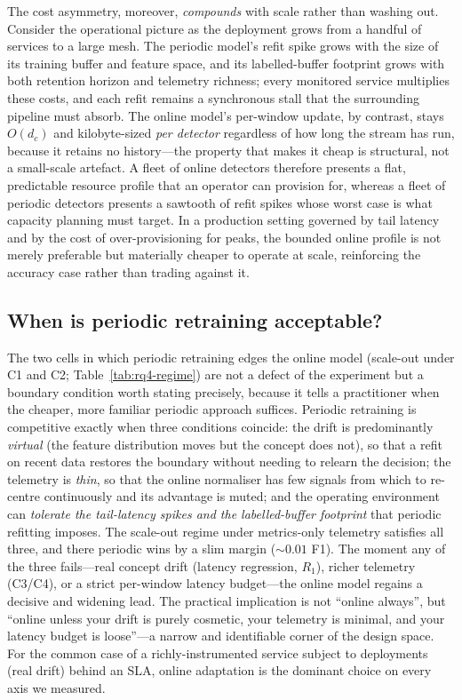 \documentclass[acmsmall]{acmart}
\begin{document}
The cost asymmetry, moreover, \emph{compounds} with scale rather than washing out. Consider the operational picture as the deployment grows from a handful of services to a large mesh. The periodic model's refit spike grows with the size of its training buffer and feature space, and its labelled-buffer footprint grows with both retention horizon and telemetry richness; every monitored service multiplies these costs, and each refit remains a synchronous stall that the surrounding pipeline must absorb. The online model's per-window update, by contrast, stays $O(d_c)$ and kilobyte-sized \emph{per detector} regardless of how long the stream has run, because it retains no history---the property that makes it cheap is structural, not a small-scale artefact. A fleet of online detectors therefore presents a flat, predictable resource profile that an operator can provision for, whereas a fleet of periodic detectors presents a sawtooth of refit spikes whose worst case is what capacity planning must target. In a production setting governed by tail latency and by the cost of over-provisioning for peaks, the bounded online profile is not merely preferable but materially cheaper to operate at scale, reinforcing the accuracy case rather than trading against it.

\subsection{When is periodic retraining acceptable?}\label{sec:disc-periodic}

The two cells in which periodic retraining edges the online model (scale-out under C1 and C2; Table~\ref{tab:rq4-regime}) are not a defect of the experiment but a boundary condition worth stating precisely, because it tells a practitioner when the cheaper, more familiar periodic approach suffices. Periodic retraining is competitive exactly when three conditions coincide: the drift is predominantly \emph{virtual} (the feature distribution moves but the concept does not), so that a refit on recent data restores the boundary without needing to relearn the decision; the telemetry is \emph{thin}, so that the online normaliser has few signals from which to re-centre continuously and its advantage is muted; and the operating environment can \emph{tolerate the tail-latency spikes and the labelled-buffer footprint} that periodic refitting imposes. The scale-out regime under metrics-only telemetry satisfies all three, and there periodic wins by a slim margin ($\sim 0.01$ F1). The moment any of the three fails---real concept drift (latency regression, $R_1$), richer telemetry (C3/C4), or a strict per-window latency budget---the online model regains a decisive and widening lead. The practical implication is not ``online always'', but ``online unless your drift is purely cosmetic, your telemetry is minimal, and your latency budget is loose''---a narrow and identifiable corner of the design space. For the common case of a richly-instrumented service subject to deployments (real drift) behind an SLA, online adaptation is the dominant choice on every axis we measured.
\end{document}
